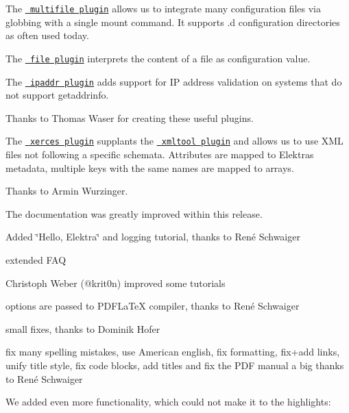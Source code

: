 The \href{https://www.libelektra.org/plugins/multifile}{\texttt{ multifile plugin}} allows us to integrate many configuration files via globbing with a single mount command. It supports {\ttfamily .d} configuration directories as often used today.

The \href{https://www.libelektra.org/plugins/file}{\texttt{ file plugin}} interprets the content of a file as configuration value.

The \href{https://www.libelektra.org/plugins/ipaddr}{\texttt{ ipaddr plugin}} adds support for IP address validation on systems that do not support {\ttfamily getaddrinfo}.

Thanks to Thomas Waser for creating these useful plugins.

The \href{https://www.libelektra.org/plugins/xerces}{\texttt{ xerces plugin}} supplants the \href{https://www.libelektra.org/plugins/xmltool}{\texttt{ xmltool plugin}} and allows us to use X\+ML files not following a specific schemata. Attributes are mapped to Elektra\textquotesingle{}s metadata, multiple keys with the same names are mapped to arrays.

Thanks to Armin Wurzinger.

The documentation was greatly improved within this release.


\begin{DoxyItemize}
\item Added \char`\"{}\+Hello, Elektra\char`\"{} and logging tutorial, thanks to René Schwaiger
\item extended F\+AQ
\item Christoph Weber (@krit0n) improved some tutorials
\item options are passed to P\+D\+F\+La\+TeX compiler, thanks to René Schwaiger
\item small fixes, thanks to Dominik Hofer
\item fix many spelling mistakes, use American english, fix formatting, fix+add links, unify title style, fix code blocks, add titles and fix the P\+DF manual a big thanks to René Schwaiger
\end{DoxyItemize}

We added even more functionality, which could not make it to the highlights\+:


